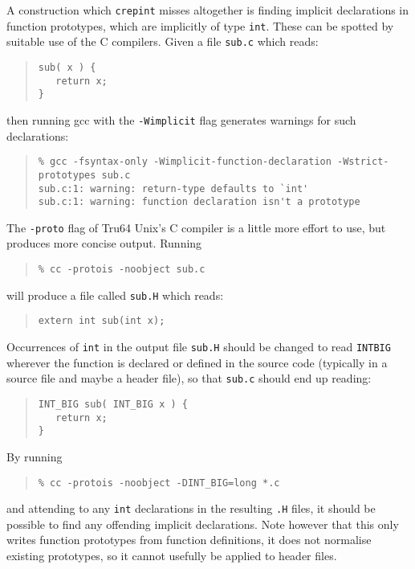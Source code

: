 \documentclass[twoside,11pt]{article}
\renewcommand{\_}{\texttt{\symbol{95}}}
\newcommand{\file}[1]{{\tt #1}}
\newcommand{\routine}[1]{{\tt #1}}
\newcommand{\cc}[1]{{\tt #1}}
\newenvironment{squote}{\begin{quote}\begin{small}}{\end{small}\end{quote}}
\begin{document}
A construction which \routine{crepint} misses altogether is finding
implicit declarations in function prototypes, which are implicitly
of type \cc{int}.
These can be spotted by suitable use of the C compilers.
Given a file \file{sub.c} which reads:
\begin{squote}
\begin{verbatim}
sub( x ) {
   return x;
}
\end{verbatim}
\end{squote}
then running gcc with the {\tt -Wimplicit} flag generates warnings for
such declarations:
\begin{squote}
\begin{verbatim}
% gcc -fsyntax-only -Wimplicit-function-declaration -Wstrict-prototypes sub.c
sub.c:1: warning: return-type defaults to `int'
sub.c:1: warning: function declaration isn't a prototype
\end{verbatim}
\end{squote}
The {\tt -proto} flag of Tru64 Unix's C compiler is a little more
effort to use, but produces more concise output.  Running
\begin{squote}
\begin{verbatim}
% cc -protois -noobject sub.c
\end{verbatim}
\end{squote}
will produce a file called \file{sub.H} which reads:
\begin{squote}
\begin{verbatim}
extern int sub(int x);
\end{verbatim}
\end{squote}
Occurrences of \cc{int} in the output file \file{sub.H} should be
changed to read \cc{INT\_BIG} wherever the function is declared or
defined in the source code (typically in a source file and maybe a
header file), so that \file{sub.c} should
end up reading:
\begin{squote}
\begin{verbatim}
INT_BIG sub( INT_BIG x ) {
   return x;
}
\end{verbatim}
\end{squote}
By running
\begin{squote}
\begin{verbatim}
% cc -protois -noobject -DINT_BIG=long *.c
\end{verbatim}
\end{squote}
and attending to any \cc{int} declarations in the resulting \file{.H} files,
it should be possible to find any offending implicit declarations.
Note however that this only writes function prototypes
from function definitions, it does not normalise existing prototypes,
so it cannot usefully be applied to header files.
\end{document}
